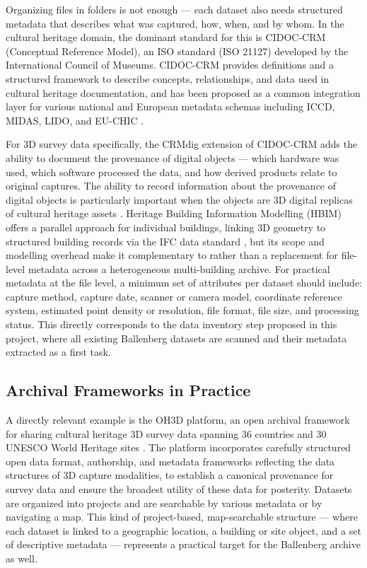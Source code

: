 \documentclass[]{report}
\begin{document}
Organizing files in folders is not enough --- each dataset also needs structured metadata that
describes what was captured, how, when, and by whom. In the cultural heritage domain, the
dominant standard for this is CIDOC-CRM (Conceptual Reference Model), an ISO standard (ISO
21127) developed by the International Council of Museums. CIDOC-CRM provides definitions and a
structured framework to describe concepts, relationships, and data used in cultural heritage
documentation, and has been proposed as a common integration layer for various national and
European metadata schemas including ICCD, MIDAS, LIDO, and EU-CHIC \cite{ronchi2014metadata}.

For 3D survey data specifically, the CRMdig extension of CIDOC-CRM adds the ability to
document the provenance of digital objects --- which hardware was used, which software
processed the data, and how derived products relate to original captures. The ability to record
information about the provenance of digital objects is particularly important when the objects
are 3D digital replicas of cultural heritage assets \cite{fresa2014metadata}. Heritage Building Information Modelling (HBIM) offers a parallel approach for individual
buildings, linking 3D geometry to structured building records via the IFC data standard
\cite{murphy2009hbim, ifc_standard}, but its scope and modelling overhead make it
complementary to rather than a replacement for file-level metadata across a heterogeneous
multi-building archive. For practical metadata at the file level, a minimum set of attributes
per dataset should include: capture method, capture date, scanner or camera model, coordinate
reference system, estimated point density or resolution, file format, file size, and
processing status. This directly corresponds
to the data inventory step proposed in this project, where all existing Ballenberg datasets are
scanned and their metadata extracted as a first task.

\subsection{Archival Frameworks in Practice}

A directly relevant example is the OH3D platform, an open archival framework for sharing
cultural heritage 3D survey data spanning 36 countries and 30 UNESCO World Heritage sites
\cite{spreafico2024archival}. The platform incorporates carefully structured open data format,
authorship, and metadata frameworks reflecting the data structures of 3D capture modalities,
to establish a canonical provenance for survey data and ensure the broadest utility of these
data for posterity. Datasets are organized into projects and are searchable by various metadata
or by navigating a map. This kind of project-based, map-searchable structure --- where
each dataset is linked to a geographic location, a building or site object, and a set of
descriptive metadata --- represents a practical target for the Ballenberg archive as well.
\end{document}

